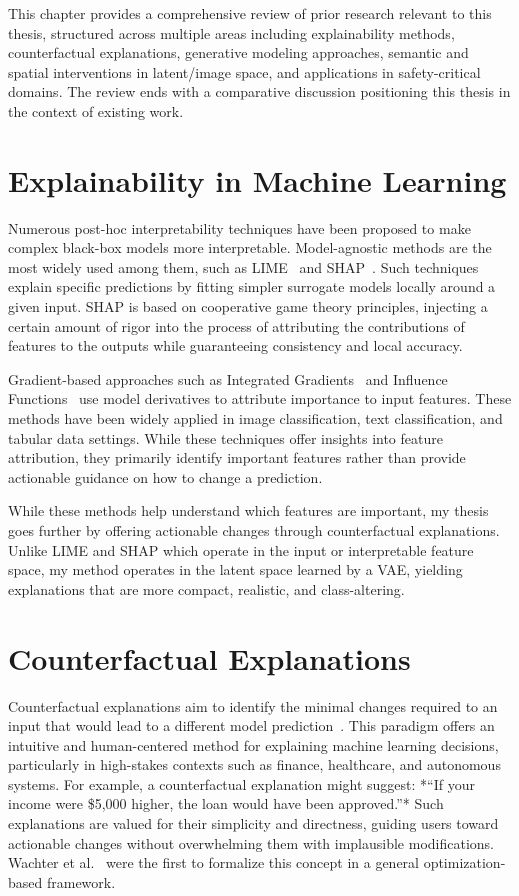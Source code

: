 This chapter provides a comprehensive review of prior research relevant to this thesis, structured across multiple areas including explainability methods, counterfactual explanations, generative modeling approaches, semantic and spatial interventions in latent/image space, and applications in safety-critical domains. The review ends with a comparative discussion positioning this thesis in the context of existing work.



\section{Explainability in Machine Learning}
Numerous post-hoc interpretability techniques have been proposed to make complex black-box models more interpretable. Model-agnostic methods are the most widely used among them, such as LIME~\cite{Ribeiro2018} and SHAP~\cite{lundberg2017unifiedapproachinterpretingmodel}. Such techniques explain specific predictions by fitting simpler surrogate models locally around a given input. SHAP is based on cooperative game theory principles, injecting a certain amount of rigor into the process of attributing the contributions of features to the outputs while guaranteeing consistency and local accuracy.

Gradient-based approaches such as Integrated Gradients~\cite{8237336} and Influence Functions~\cite{pmlr-v70-koh17a} use model derivatives to attribute importance to input features. These methods have been widely applied in image classification, text classification, and tabular data settings. While these techniques offer insights into feature attribution, they primarily identify important features rather than provide actionable guidance on how to change a prediction.

While these methods help understand which features are important, my thesis goes further by offering actionable changes through counterfactual explanations. Unlike LIME and SHAP which operate in the input or interpretable feature space, my method operates in the latent space learned by a VAE, yielding explanations that are more compact, realistic, and class-altering.


\section{Counterfactual Explanations}

Counterfactual explanations aim to identify the minimal changes required to an input that would lead to a different model prediction~\cite{wachter2018CE}. This paradigm offers an intuitive and human-centered method for explaining machine learning decisions, particularly in high-stakes contexts such as finance, healthcare, and autonomous systems. For example, a counterfactual explanation might suggest: *“If your income were \$5,000 higher, the loan would have been approved.”* Such explanations are valued for their simplicity and directness, guiding users toward actionable changes without overwhelming them with implausible modifications. Wachter et al.~\cite{wachter2018CE} were the first to formalize this concept in a general optimization-based framework.

